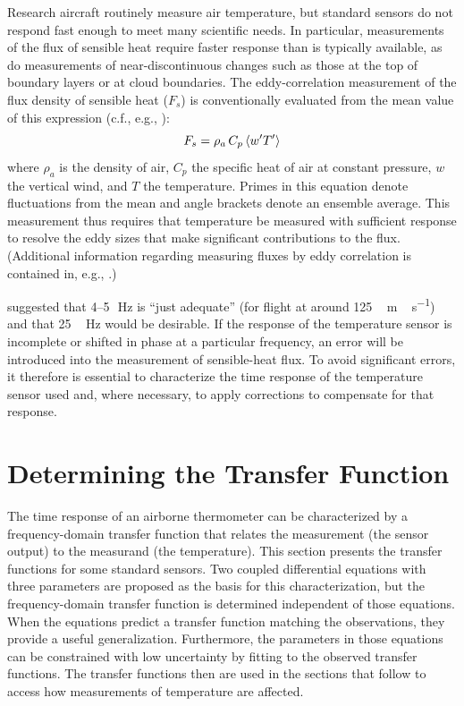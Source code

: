 \documentclass[amt, manuscript]{copernicus}
\begin{document}
\newpage

\introduction[Introduction]

Research aircraft routinely measure air temperature, but standard
sensors do not respond fast enough to meet many scientific needs. In
particular, measurements of the flux of sensible heat require faster
response than is typically available, as do measurements of
near-discontinuous changes such as those at the top of boundary layers
or at cloud boundaries. The eddy-correlation measurement of the flux
density of sensible heat (\(F_{s}\)) is conventionally evaluated from
the mean value of this expression (c.f., e.g., \citet{hartmann201695}):
\begin{equation}
F_{s}=\rho_{a}\thinspace C_{p}\left\langle w^{\prime}T^{\prime}\right\rangle \label{eq:heatFlux}
\end{equation} where \(\rho_{a}\) is the density of air, \(C_{p}\) the
specific heat of air at constant pressure, \(w\) the vertical wind, and
\(T\) the temperature. Primes in this equation denote fluctuations from
the mean and angle brackets denote an ensemble average. This measurement
thus requires that temperature be measured with sufficient response to
resolve the eddy sizes that make significant contributions to the flux.
(Additional information regarding measuring fluxes by eddy correlation
is contained in, e.g., \citet{lenschow95micro}.)

\citet{FrieheKhelif1992} suggested that 4--5\unit{\,Hz} is ``just
adequate'' (for flight at around \unit{125\,m\,s^{-1}}) and that
\unit{25\,Hz} would be desirable. If the response of the temperature
sensor is incomplete or shifted in phase at a particular frequency, an
error will be introduced into the measurement of sensible-heat flux. To
avoid significant errors, it therefore is essential to characterize the
time response of the temperature sensor used and, where necessary, to
apply corrections to compensate for that response.

\section{\texorpdfstring{Determining the Transfer Function
\label{sec:theTransferFn}}{Determining the Transfer Function }}

The time response of an airborne thermometer can be characterized by a
frequency-domain transfer function that relates the measurement (the
sensor output) to the measurand (the temperature). This section presents
the transfer functions for some standard sensors. Two coupled
differential equations with three parameters are proposed as the basis
for this characterization, but the frequency-domain transfer function is
determined independent of those equations. When the equations predict a
transfer function matching the observations, they provide a useful
generalization. Furthermore, the parameters in those equations can be
constrained with low uncertainty by fitting to the observed transfer
functions. The transfer functions then are used in the sections that
follow to access how measurements of temperature are affected.
\end{document}
